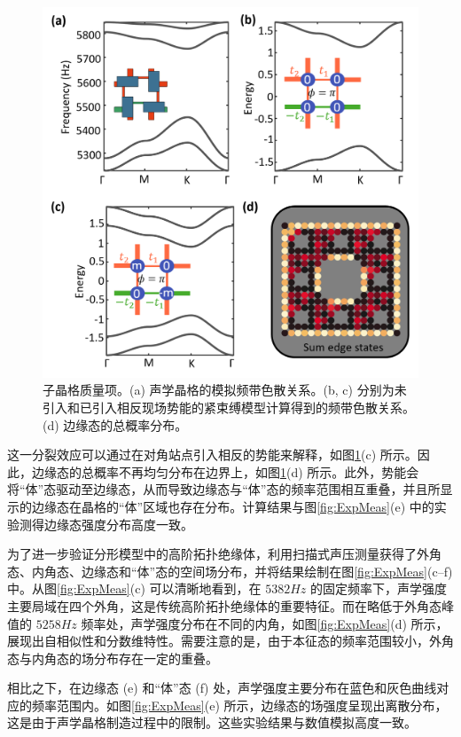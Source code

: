 \begin{figure}[htbp]
    \centering
    \includegraphics[width=0.5\linewidth]{figure/HOTIExp/mass.png}
    \caption{子晶格质量项。(a) 声学晶格的模拟频带色散关系。(b, c) 分别为未引入和已引入相反现场势能的紧束缚模型计算得到的频带色散关系。(d) 边缘态的总概率分布。}
    \label{fig:mass}
\end{figure}

这一分裂效应可以通过在对角站点引入相反的势能来解释，如图\ref{fig:mass}(c) 所示。因此，边缘态的总概率不再均匀分布在边界上，如图\ref{fig:mass}(d) 所示。此外，势能会将“体”态驱动至边缘态，从而导致边缘态与“体”态的频率范围相互重叠，并且所显示的边缘态在晶格的“体”区域也存在分布。计算结果与图\ref{fig:ExpMeas}(e) 中的实验测得边缘态强度分布高度一致。

为了进一步验证分形模型中的高阶拓扑绝缘体，利用扫描式声压测量获得了外角态、内角态、边缘态和“体”态的空间场分布，并将结果绘制在图\ref{fig:ExpMeas}(c–f) 中。从图\ref{fig:ExpMeas}(c) 可以清晰地看到，在 $5382 Hz$ 的固定频率下，声学强度主要局域在四个外角，这是传统高阶拓扑绝缘体的重要特征。而在略低于外角态峰值的 $5258 Hz$ 频率处，声学强度分布在不同的内角，如图\ref{fig:ExpMeas}(d) 所示，展现出自相似性和分数维特性。需要注意的是，由于本征态的频率范围较小，外角态与内角态的场分布存在一定的重叠。

相比之下，在边缘态 (e) 和“体”态 (f) 处，声学强度主要分布在蓝色和灰色曲线对应的频率范围内。如图\ref{fig:ExpMeas}(e) 所示，边缘态的场强度呈现出离散分布，这是由于声学晶格制造过程中的限制。这些实验结果与数值模拟高度一致。

